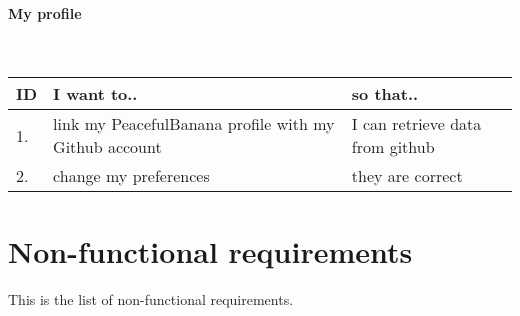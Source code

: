 \paragraph{My profile}\mbox{}\\
\vspace{0.5cm}
 \begin{tabularx}{\linewidth}{| l | X | X |}
    \hline
    \rowcolor[gray]{0.8}
    \textbf{ID} & \textbf{I want to..} & \textbf{so that..} \\
    \hline
    1. & link my PeacefulBanana profile with my Github account & I can retrieve data from github\\
    2. & change my preferences  & they are correct\\
    \hline
\end{tabularx}
\vspace{0.5cm}

\section{Non-functional requirements}
This is the list of non-functional requirements.
